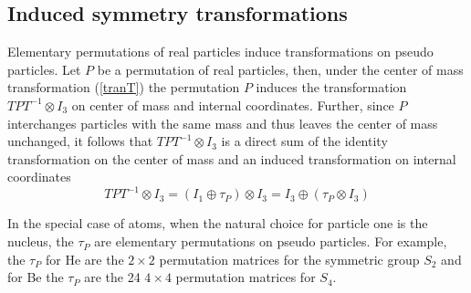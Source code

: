 \documentclass[12pt,thmsa,suthesis,verbatim]{report}
\begin{document}
\subsection{Induced symmetry transformations}

Elementary permutations of real particles induce transformations on pseudo
particles. Let $P$ be a permutation of real particles, then, under the
center of mass transformation (\ref{tranT}) the permutation $P$ induces the
transformation $TPT^{-1}\otimes I_3$ on center of mass and internal
coordinates. Further, since $P$ interchanges particles with the same mass
and thus leaves the center of mass unchanged, it follows that $%
TPT^{-1}\otimes I_3$ is a direct sum of the identity transformation on the
center of mass and an induced transformation on internal coordinates 
\begin{equation}
TPT^{-1}\otimes I_3=\left( I_1\oplus \tau _P\right) \otimes I_3=I_3\oplus
\left( \tau _P\otimes I_3\right)  \label{TPT}
\end{equation}

In the special case of atoms, when the natural choice for particle one is
the nucleus, the $\tau _P$ are elementary permutations on pseudo particles.
For example, the $\tau _P$ for He are the $2\times 2$ permutation matrices
for the symmetric group $S_2$ and for Be the $\tau _P$ are the 24 $4\times 4$
permutation matrices for $S_4$.
\end{document}
